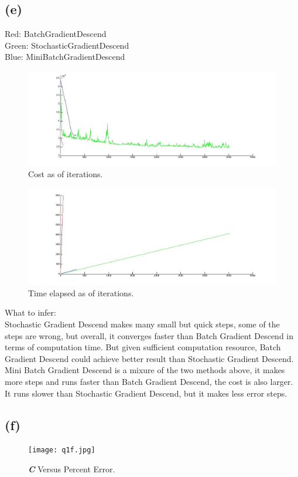 \documentclass{article}
\begin{document}
\subsection{(e)}
Red: BatchGradientDescend \\ Green: StochasticGradientDescend \\ Blue: MiniBatchGradientDescend\\
\begin{figure}[H]
\centering
\includegraphics[scale=0.5]{q1e-cost.jpg}
\caption{ Cost as of iterations. }
\label{}
\end{figure}

\begin{figure}[H]
\centering
\includegraphics[scale=0.5]{q1e-time.jpg}
\caption{ Time elapsed as of iterations. }
\label{}
\end{figure}

What to infer: \\
Stochastic Gradient Descend makes many small but quick steps, some of the steps are wrong, but overall, it converges faster than Batch Gradient Descend in terms of computation time. But given sufficient computation resource, Batch Gradient Descend could achieve better result than Stochastic Gradient Descend.
Mini Batch Gradient Descend is a mixure of the two methods above, it makes more steps and runs faster than Batch Gradient Descend, the cost is also larger. It runs slower than Stochastic Gradient Descend, but it makes less error steps.

\subsection{(f)}
\begin{figure}[H]
\centering
\texttt{[image: q1f.jpg]}
\caption{ \textbf{\em{C}} Versus Percent Error. }
\label{}
\end{figure}
\end{document}
